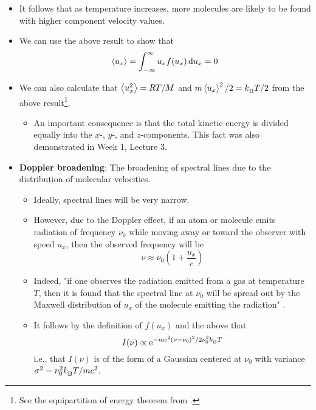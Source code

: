 \documentclass[../notes.tex]{subfiles}
\begin{document}
\begin{itemize}
\begin{itemize}
    \end{itemize}
    \item It follows that as temperature increases, more molecules are likely to be found with higher component velocity values.
    \item We can use the above result to show that
    \begin{equation*}
        \prb{u_x} = \int_{-\infty}^\infty u_xf(u_x)\dd{u_x} = 0
    \end{equation*}
    \item We can also calculate that $\prb{u_x^2}=RT/M$ and $m\prb{u_x}^2/2=\kB T/2$ from the above result\footnote{See the equipartition of energy theorem from \textcite{bib:PHYS13300Notes}.}.
    \begin{itemize}
        \item An important consequence is that the total kinetic energy is divided equally into the $x$-, $y$-, and $z$-components. This fact was also demonstrated in Week 1, Lecture 3.
    \end{itemize}
    \item \textbf{Doppler broadening}: The broadening of spectral lines due to the distribution of molecular velocities.
    \begin{itemize}
        \item Ideally, spectral lines will be very narrow.
        \item However, due to the Doppler effect, if an atom or molecule emits radiation of frequency $\nu_0$ while moving away or toward the observer with speed $u_x$, then the observed frequency will be
        \begin{equation*}
            \nu \approx \nu_0\left( 1+\frac{u_x}{c} \right)
        \end{equation*}
        \item Indeed, "if one observes the radiation emitted from a gas at temperature $T$, then it is found that the spectral line at $\nu_0$ will be spread out by the Maxwell distribution of $u_x$ of the molecule emitting the radiation" \parencite[1021]{bib:McQuarrieSimon}.
        \item It follows by the definition of $f(u_x)$ and the above that
        \begin{equation*}
            I(\nu) \propto \e[-mc^2(\nu-\nu_0)^2/2\nu_0^2\kB T]
        \end{equation*}
        i.e., that $I(\nu)$ is of the form of a Gaussian centered at $\nu_0$ with variance $\sigma^2=\nu_0^2\kB T/mc^2$.
    \end{itemize}

\end{itemize}
\end{document}
